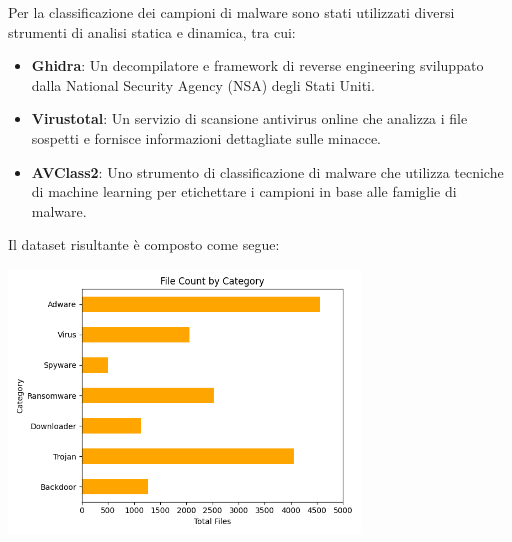 Per la classificazione dei campioni di malware sono stati utilizzati diversi strumenti di analisi statica e dinamica, tra cui:
\begin{itemize}
    \item \textbf{Ghidra}: Un decompilatore e framework di reverse engineering sviluppato dalla National Security Agency (NSA) degli Stati Uniti.
    \item \textbf{Virustotal}: Un servizio di scansione antivirus online che analizza i file sospetti e fornisce informazioni dettagliate sulle minacce.
    \item \textbf{AVClass2}: Uno strumento di classificazione di malware che utilizza tecniche di machine learning per etichettare i campioni in base alle famiglie di malware.
\end{itemize}

Il dataset risultante è composto come segue:

\begin{center}
	\includegraphics[width=0.7\textwidth]{images/total_families.png}
\end{center}
\newpage
